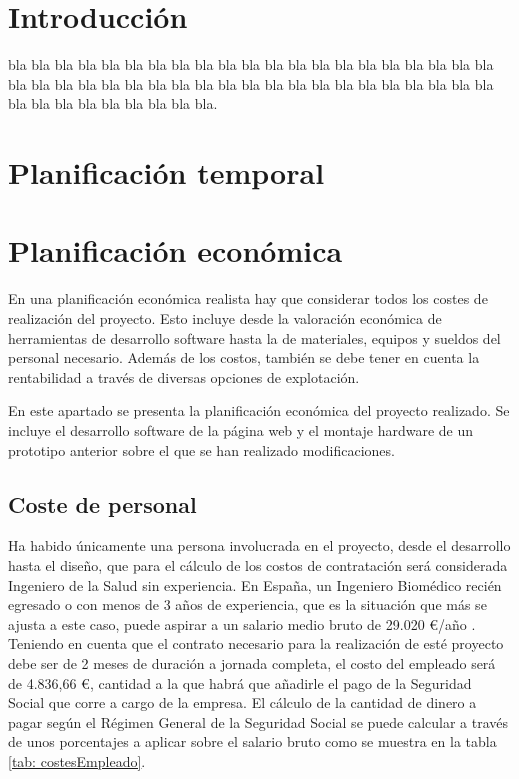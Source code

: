 
\section{Introducción}

bla bla bla bla bla bla bla bla bla bla bla bla bla bla bla bla bla bla bla bla bla bla bla bla bla bla bla bla bla bla bla bla bla bla bla bla bla bla bla bla bla bla bla bla bla bla bla bla bla bla bla.


\section{Planificación temporal}


\section{Planificación económica}
En una planificación económica realista hay que considerar todos los costes de realización del proyecto. Esto incluye desde la valoración económica de herramientas de desarrollo software hasta la de materiales, equipos y sueldos del personal necesario.
Además de los costos, también se debe tener en cuenta la rentabilidad a través de diversas opciones de explotación.

En este apartado se presenta la planificación económica del proyecto realizado. Se incluye el desarrollo software de la página web y el montaje hardware de un prototipo anterior sobre el que se han realizado modificaciones.

\subsection{Coste de personal}
Ha habido únicamente una persona involucrada en el proyecto, desde el desarrollo hasta el diseño, que para el cálculo de los costos de contratación será considerada Ingeniero de la Salud sin experiencia. 
En España, un Ingeniero Biomédico recién egresado o con menos de 3 años de experiencia, que es la situación que más se ajusta a este caso, puede aspirar a un salario medio bruto de 29.020 €/año \cite{jobtedIngenieroBiomedico}. Teniendo en cuenta que el contrato necesario para la realización de esté proyecto debe ser de 2 meses de duración a jornada completa, el costo del empleado será de 4.836,66 €, cantidad a la que habrá que añadirle el pago de la Seguridad Social que corre a cargo de la empresa. El cálculo de la cantidad de dinero a pagar según el Régimen General de la Seguridad Social \cite{SeguridaSocial:online} se puede calcular a través de unos porcentajes a aplicar sobre el salario bruto como se muestra en la tabla \ref{tab: costesEmpleado}.

